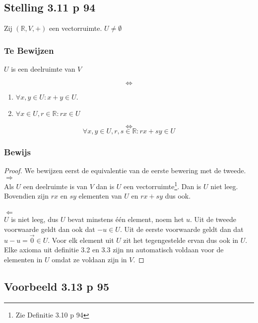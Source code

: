 \documentclass[lineaire_algebra_oplossingen.tex]{subfiles}
\begin{document}
\subsection{Stelling 3.11 p 94}
\label{3.11}
Zij $(\mathbb{R},V,+)$ een vectorruimte. $U \neq \emptyset$

\subsubsection*{Te Bewijzen}
\begin{center}
$U$ is een deelruimte van $V$
\end{center}
\[
\Leftrightarrow
\] 
\begin{enumerate}
\item $\forall x,y\in U: x+y\in U$.
\item $\forall x\in U, r\in \mathbb{R}: rx \in U$
\end{enumerate}
\[
\Leftrightarrow
\]
\[
\forall x,y\in U, r,s\in \mathbb{R}: rx+sy\in U
\]

\subsubsection*{Bewijs}
\begin{proof}
We bewijzen eerst de equivalentie van de eerste bewering met de tweede.\\
\emph{$\Rightarrow$}\\
Als $U$ een deelruimte is van $V$ dan is $U$ een vectorruimte\footnote{Zie Definitie 3.10 p 94}. Dan is $U$ niet leeg. Bovendien zijn $rx$ en $sy$ elementen van $U$ en $rx+sy$ dus ook.\\\\
\emph{$\Leftarrow$}\\
$U$ is niet leeg, dus $U$ bevat minstens \'e\'en element, noem het $u$. Uit de tweede voorwaarde geldt dan ook dat $-u \in U$. Uit de eerste voorwaarde geldt dan dat $u-u = \vec{0} \in U$. Voor elk element uit $U$ zit het tegengestelde ervan dus ook in $U$. Elke axioma uit definitie 3.2 en 3.3 zijn nu automatisch voldaan voor de elementen in $U$ omdat ze voldaan zijn in $V$.
\end{proof}


\subsection{Voorbeeld 3.13 p 95}
\label{3.13}
\end{document}
